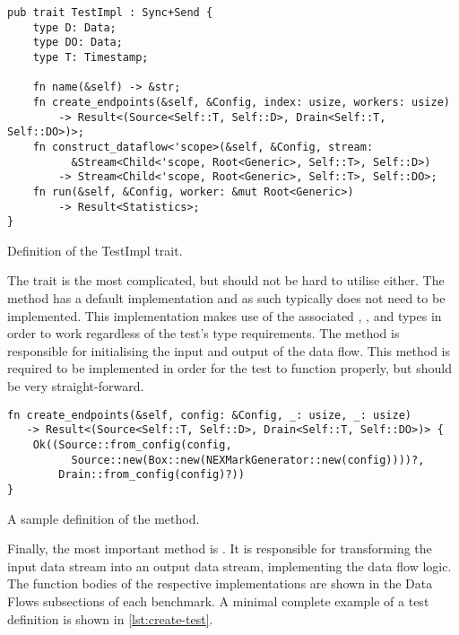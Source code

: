 \begin{listing}[H]
\begin{verbatim}
pub trait TestImpl : Sync+Send {
    type D: Data;
    type DO: Data;
    type T: Timestamp;

    fn name(&self) -> &str;
    fn create_endpoints(&self, &Config, index: usize, workers: usize)
        -> Result<(Source<Self::T, Self::D>, Drain<Self::T, Self::DO>)>;
    fn construct_dataflow<'scope>(&self, &Config, stream: 
          &Stream<Child<'scope, Root<Generic>, Self::T>, Self::D>)
        -> Stream<Child<'scope, Root<Generic>, Self::T>, Self::DO>;
    fn run(&self, &Config, worker: &mut Root<Generic>)
        -> Result<Statistics>;
}
\end{verbatim}
  \caption{Definition of the TestImpl trait.}
  \label{lst:testimpl-trait}
\end{listing}

The  trait is the most complicated, but should not be hard to utilise either. The  method has a default implementation and as such typically does not need to be implemented. This implementation makes use of the associated , , and  types in order to work regardless of the test's type requirements. The  method is responsible for initialising the input and output of the data flow. This method is required to be implemented in order for the test to function properly, but should be very straight-forward.

\begin{listing}[H]
\begin{verbatim}
fn create_endpoints(&self, config: &Config, _: usize, _: usize)
   -> Result<(Source<Self::T, Self::D>, Drain<Self::T, Self::DO>)> {
    Ok((Source::from_config(config,
          Source::new(Box::new(NEXMarkGenerator::new(config))))?,
        Drain::from_config(config)?))
}
\end{verbatim}
  \caption{A sample definition of the  method.}
  \label{lst:create-endpoints}
\end{listing}

Finally, the most important method is . It is responsible for transforming the input data stream into an output data stream, implementing the data flow logic. The function bodies of the respective  implementations are shown in the Data Flows subsections of each benchmark. A minimal complete example of a test definition is shown in \autoref{lst:create-test}.

